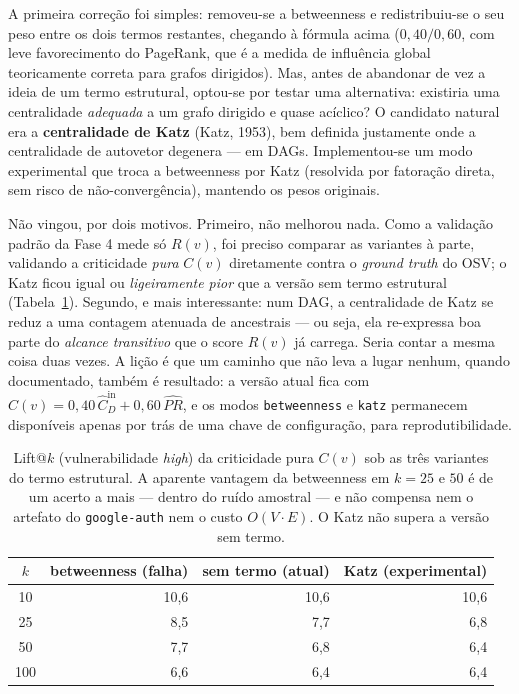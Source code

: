 \documentclass[11pt,a4paper]{article}
\begin{document}
A primeira correção foi simples: removeu-se a betweenness e redistribuiu-se o seu peso
entre os dois termos restantes, chegando à fórmula acima ($0{,}40 / 0{,}60$, com leve
favorecimento do PageRank, que é a medida de influência global teoricamente correta
para grafos dirigidos). Mas, antes de abandonar de vez a ideia de um termo estrutural,
optou-se por testar uma alternativa: existiria uma centralidade \emph{adequada} a um grafo
dirigido e quase acíclico? O candidato natural era a \textbf{centralidade de Katz}
(Katz, 1953), bem definida justamente onde a centralidade de autovetor degenera ---
em DAGs. Implementou-se um modo experimental que troca a betweenness por Katz (resolvida
por fatoração direta, sem risco de não-convergência), mantendo os pesos originais.

Não vingou, por dois motivos. Primeiro, não melhorou nada. Como a validação padrão da
Fase 4 mede só $R(v)$, foi preciso comparar as variantes à parte, validando a
criticidade \emph{pura} $C(v)$ diretamente contra o \emph{ground truth} do OSV; o Katz
ficou igual ou \emph{ligeiramente pior} que a versão sem termo estrutural
(Tabela~\ref{tab:variantes}). Segundo, e mais interessante: num DAG, a centralidade de
Katz se reduz a uma contagem atenuada de ancestrais --- ou seja, ela re-expressa boa
parte do \emph{alcance transitivo} que o score $R(v)$ já carrega. Seria contar
a mesma coisa duas vezes. A lição é que um caminho que não leva a lugar nenhum, quando
documentado, também é resultado: a versão atual fica com
$C(v) = 0{,}40\,\hat{C}_D^{\text{in}} + 0{,}60\,\widehat{PR}$, e os modos
\texttt{betweenness} e \texttt{katz} permanecem disponíveis apenas por trás de uma
chave de configuração, para reprodutibilidade.

\begin{table}[h]
\centering\small
\caption{Lift@$k$ (vulnerabilidade \emph{high}) da criticidade pura $C(v)$ sob as três
variantes do termo estrutural. A aparente vantagem da betweenness em $k=25$ e $50$ é de
um acerto a mais --- dentro do ruído amostral --- e não compensa nem o artefato do
\texttt{google-auth} nem o custo $O(V\cdot E)$. O Katz não supera a versão sem termo.}
\label{tab:variantes}
\begin{tabular}{crrr}
\toprule
$k$ & betweenness (falha)  & sem termo (atual) & Katz (experimental) \\
\midrule
10  & 10,6 & 10,6 & 10,6 \\
25  &  8,5 &  7,7 &  6,8 \\
50  &  7,7 &  6,8 &  6,4 \\
100 &  6,6 &  6,4 &  6,4 \\
\bottomrule
\end{tabular}
\end{table}
\end{document}
